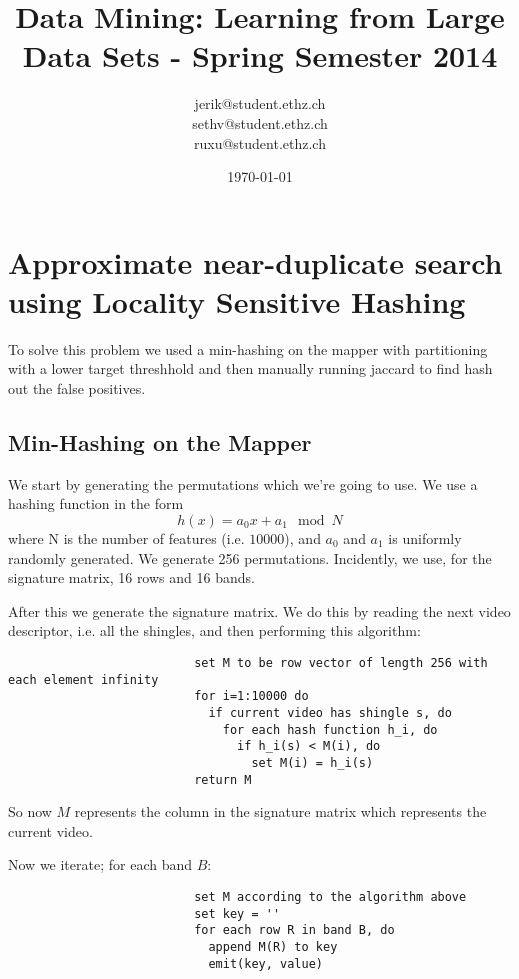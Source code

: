 \documentclass[a4paper, 11pt]{article}
\title{Data Mining: Learning from Large Data Sets - Spring Semester 2014}
\author{jerik@student.ethz.ch\\ sethv@student.ethz.ch\\ ruxu@student.ethz.ch\\}
\date{\today}
\begin{document}
\maketitle

\section{Approximate near-duplicate search using Locality Sensitive Hashing} 
To solve this problem we used a min-hashing on the mapper with partitioning with a lower target threshhold and then manually running jaccard to find hash out the false positives.

        \subsection{Min-Hashing on the Mapper}
                We start by generating the permutations which we're going to use. We use a hashing function in the form
                        \[h(x) = a_0x + a_1 \mod N\]
                where N is the number of features (i.e. $10000$), and $a_0$ and $a_1$ is uniformly randomly generated. We generate 256 permutations. Incidently, we use, for the signature matrix, 16 rows and 16 bands.

                After this we generate the signature matrix. We do this by reading the next video descriptor, i.e. all the shingles, and then performing this algorithm:
                \begin{verbatim}
                          set M to be row vector of length 256 with each element infinity
                          for i=1:10000 do
                            if current video has shingle s, do
                              for each hash function h_i, do
                                if h_i(s) < M(i), do
                                  set M(i) = h_i(s)
                          return M
                \end{verbatim}
                So now $M$ represents the column in the signature matrix which represents the current video. 

                Now we iterate; for each band $B$:
                \begin{verbatim}
                          set M according to the algorithm above
                          set key = ''
                          for each row R in band B, do
                            append M(R) to key
                            emit(key, value)
                \end{verbatim}
\end{document}
